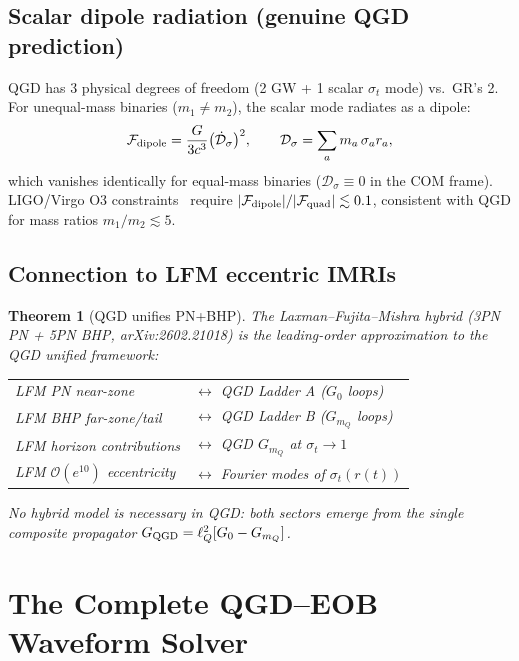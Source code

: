 \documentclass[11pt,a4paper]{article}
\theoremstyle{plain}
\newtheorem{theorem}{Theorem}[section]
\theoremstyle{definition}
\theoremstyle{remark}
\newcommand{\lQ}{\ell_Q}
\newcommand{\mQ}{m_Q}
\begin{document}
\subsection{Scalar dipole radiation (genuine QGD prediction)}

QGD has 3 physical degrees of freedom (2 GW + 1 scalar $\sigma_t$ mode)
vs.\ GR's 2.  For unequal-mass binaries ($m_1\ne m_2$), the scalar mode
radiates as a dipole:
\begin{equation}
  \mathcal{F}_{\rm dipole} = \frac{G}{3c^3}\bigl(\dot{\mathcal{D}}_\sigma\bigr)^2,
  \qquad \mathcal{D}_\sigma = \sum_a m_a\,\sigma_a r_a,
  \label{eq:dipole}
\end{equation}
which vanishes identically for equal-mass binaries ($\mathcal{D}_\sigma\equiv0$
in the COM frame).  LIGO/Virgo O3 constraints~\cite{Abbott2021} require
$|\mathcal{F}_{\rm dipole}|/|\mathcal{F}_{\rm quad}|\lesssim0.1$,
consistent with QGD for mass ratios $m_1/m_2\lesssim5$.

\subsection{Connection to LFM eccentric IMRIs}

\begin{theorem}[QGD unifies PN+BHP]\label{thm:LFM}
The Laxman--Fujita--Mishra hybrid (3PN PN + 5PN BHP, arXiv:2602.21018)
is the leading-order approximation to the QGD unified framework:
\begin{center}
\renewcommand{\arraystretch}{1.2}
\begin{tabular}{@{}ll@{}}
  LFM PN near-zone & $\leftrightarrow$ QGD Ladder A ($G_0$ loops)\\
  LFM BHP far-zone/tail & $\leftrightarrow$ QGD Ladder B ($G_{\mQ}$ loops)\\
  LFM horizon contributions & $\leftrightarrow$ QGD $G_{\mQ}$ at $\sigma_t\to1$\\
  LFM $\mathcal{O}(e^{10})$ eccentricity & $\leftrightarrow$ Fourier modes of $\sigma_t(r(t))$
\end{tabular}
\end{center}
No hybrid model is necessary in QGD: both sectors emerge from the single
composite propagator $G_{\rm QGD} = \lQ^2[G_0-G_{\mQ}]$.
\end{theorem}

\section{The Complete QGD--EOB Waveform Solver}
\label{sec:solver}
\end{document}
